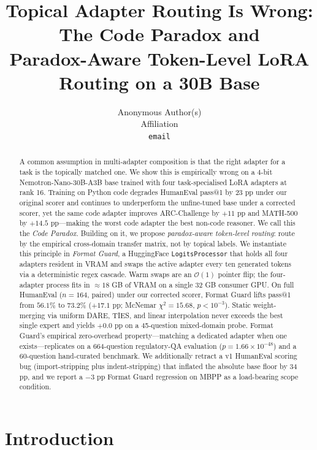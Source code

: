 \documentclass{article}
\title{Topical Adapter Routing Is Wrong: The Code Paradox and\\Paradox-Aware Token-Level LoRA Routing on a 30B Base}
\author{%
  Anonymous Author(s) \\
  Affiliation \\
  \texttt{email}
}
\begin{document}
\maketitle

\begin{abstract}
A common assumption in multi-adapter composition is that the right adapter for a task is the topically matched one. We show this is empirically wrong on a 4-bit Nemotron-Nano-30B-A3B base trained with four task-specialised LoRA adapters at rank 16. Training on Python code degrades HumanEval pass@1 by 23 pp under our original scorer and continues to underperform the unfine-tuned base under a corrected scorer, yet the same code adapter improves ARC-Challenge by $+11$ pp and MATH-500 by $+14.5$ pp---making the worst code adapter the best non-code reasoner. We call this the \emph{Code Paradox}. Building on it, we propose \emph{paradox-aware token-level routing}: route by the empirical cross-domain transfer matrix, not by topical labels. We instantiate this principle in \emph{Format Guard}, a HuggingFace \texttt{LogitsProcessor} that holds all four adapters resident in VRAM and swaps the active adapter every ten generated tokens via a deterministic regex cascade. Warm swaps are an $\mathcal{O}(1)$ pointer flip; the four-adapter process fits in $\approx 18$ GB of VRAM on a single 32 GB consumer GPU. On full HumanEval ($n=164$, paired) under our corrected scorer, Format Guard lifts pass@1 from $56.1\%$ to $73.2\%$ ($+17.1$ pp; McNemar $\chi^2 = 15.68$, $p < 10^{-3}$). Static weight-merging via uniform DARE, TIES, and linear interpolation never exceeds the best single expert and yields $+0.0$ pp on a 45-question mixed-domain probe. Format Guard's empirical zero-overhead property---matching a dedicated adapter when one exists---replicates on a 664-question regulatory-QA evaluation ($p = 1.66 \times 10^{-48}$) and a 60-question hand-curated benchmark. We additionally retract a v1 HumanEval scoring bug (import-stripping plus indent-stripping) that inflated the absolute base floor by 34 pp, and we report a $-3$ pp Format Guard regression on MBPP as a load-bearing scope condition.
\end{abstract}

\section{Introduction}
\end{document}
